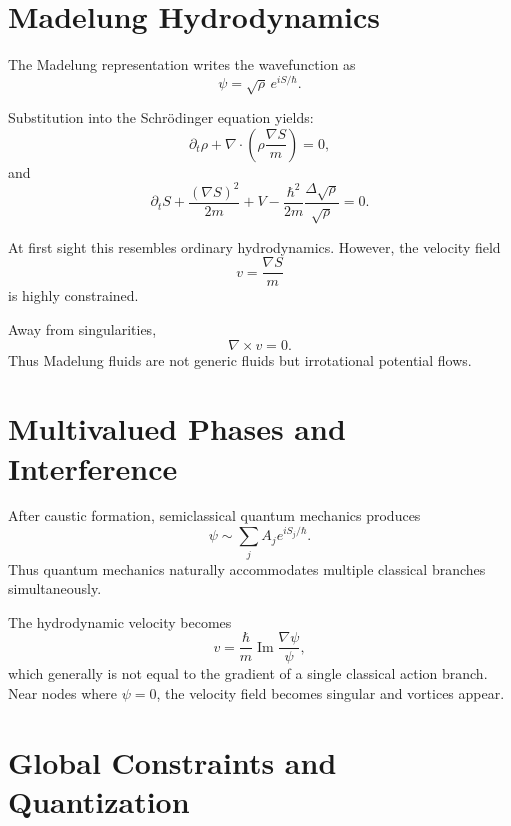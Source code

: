 \section{Madelung Hydrodynamics}

The Madelung representation writes the wavefunction as
\begin{equation}
\psi=\sqrt{\rho}\,e^{iS/\hbar}.
\end{equation}

Substitution into the Schr\"odinger equation yields:
\begin{equation}
\partial_t \rho+\nabla\cdot\left(\rho\frac{\nabla S}{m}\right)=0,
\label{continuity}
\end{equation}
and
\begin{equation}
\partial_t S+\frac{(\nabla S)^2}{2m}+V
    -\frac{\hbar^2}{2m}\frac{\Delta\sqrt{\rho}}{\sqrt{\rho}}=0.
\label{madelungHJ}
\end{equation}

At first sight this resembles ordinary hydrodynamics. However, the velocity field
\[v=\frac{\nabla S}{m}\]
is highly constrained.

Away from singularities,
\begin{equation}
\nabla\times v=0.
\end{equation}
Thus Madelung fluids are not generic fluids but irrotational potential flows.

\section{Multivalued Phases and Interference}

After caustic formation, semiclassical quantum mechanics produces
\begin{equation}
\psi \sim \sum_j A_j e^{iS_j/\hbar}.
\end{equation}
Thus quantum mechanics naturally accommodates multiple classical branches simultaneously.

The hydrodynamic velocity becomes
\begin{equation}
v=\frac{\hbar}{m}\operatorname{Im}\frac{\nabla\psi}{\psi},
\end{equation}
which generally is not equal to the gradient of a single classical action branch.
Near nodes where $\psi=0$,
the velocity field becomes singular and vortices appear.

\section{Global Constraints and Quantization}

